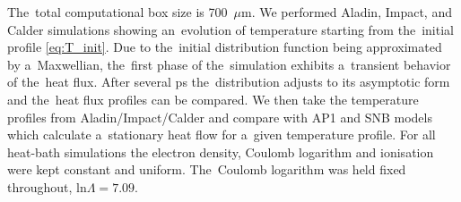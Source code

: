 \documentclass[
 aps,
 jmp,
 amsmath,amssymb,
 twocolumn,
]{revtex4-1}
\newcommand{\figscale}{0.48}
\newcommand{\vect}[1]{\boldsymbol{#1}}
\newcommand{\Zbar}{Z}
\newcommand{\E}{\vect{E}}
\newcommand{\lnc}{\text{ln}\Lambda}
\begin{document}
 %

The~total computational box size is 700~$\mu$m.
We performed Aladin, Impact, and Calder simulations showing an~evolution of
temperature starting from the~initial profile \eqref{eq:T_init}. 
Due to the~initial distribution function being approximated by a~Maxwellian,
the~first phase of the~simulation exhibits a~transient behavior of the~heat
flux. After several ps the~distribution adjusts to its asymptotic form
and the~heat flux profiles can be compared. 
We then take the temperature profiles from Aladin/Impact/Calder and compare 
with AP1 and SNB models which calculate a~stationary heat flow
for a~given temperature profile. 
For all heat-bath simulations the electron density, Coulomb logarithm and 
ionisation were kept constant and uniform.
The~Coulomb logarithm was held fixed throughout, $\lnc = 7.09$.
\end{document}

